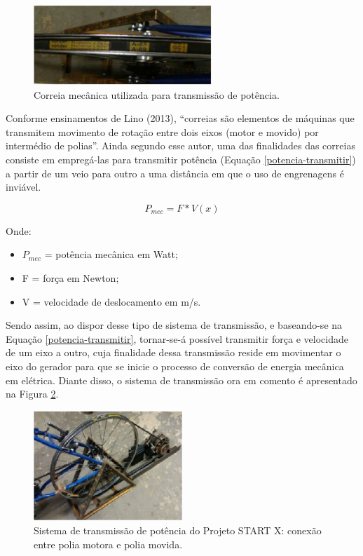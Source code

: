 \begin{figure}
  \centering
  \includegraphics[width=0.6\textwidth]{figuras/image1}
  \caption{ Correia mecânica utilizada para transmissão de potência.}
  \label{correia-mecanica}
\end{figure}

Conforme ensinamentos de Lino (2013), “correias são elementos de máquinas que transmitem movimento de rotação entre dois eixos (motor e movido) por intermédio de polias”. Ainda segundo esse autor, uma das finalidades das correias consiste em empregá-las para transmitir potência (Equação \ref{potencia-transmitir}) a partir de um veio para outro a uma distância em que o uso de engrenagens é inviável.

\begin{equation}
  P_{mec} = F\ast V\left ( x \right )
  \label{potencia-transmitir}
\end{equation}

Onde: 

\begin{itemize}
  \item $P_{mec}$ = potência mecânica em Watt;
  \item F = força em Newton;
  \item V = velocidade de deslocamento em m/s.
\end{itemize}

Sendo assim, ao dispor desse tipo de sistema de transmissão, e baseando-se na Equação \ref{potencia-transmitir}, tornar-se-á possível transmitir força e velocidade de um eixo a outro, cuja finalidade dessa transmissão reside em movimentar o eixo do gerador para que se inicie o processo de conversão de energia mecânica em elétrica. Diante disso, o sistema de transmissão ora em comento é apresentado na Figura \ref{sistema-transmissao}.

\begin{figure}
  \centering
  \includegraphics[width=0.5\textwidth]{figuras/image2}
  \caption{Sistema de transmissão de potência do Projeto START X: conexão entre polia motora e polia movida.}
  \label{sistema-transmissao}
\end{figure}

